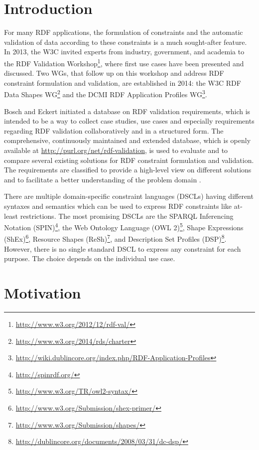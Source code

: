 \documentclass{llncs}
\begin{document}
\section{Introduction}

For many RDF applications, the formulation of constraints and the automatic validation of data according to these constraints is a much sought-after feature. 
In 2013, the W3C invited experts from industry, government, and academia to the RDF Validation Workshop\footnote{\url{http://www.w3.org/2012/12/rdf-val/}}, 
where first use cases have been presented and discussed. 
Two WGs, that follow up on this workshop and address RDF constraint formulation and validation, are established in 2014: 
the W3C RDF Data Shapes WG\footnote{\url{http://www.w3.org/2014/rds/charter}} and the DCMI RDF Application Profiles WG\footnote{\url{http://wiki.dublincore.org/index.php/RDF-Application-Profiles}}. 

Bosch and Eckert \cite{BoschEckert2014} initiated a database on RDF validation requirements, which is intended to be a way to collect case studies, use cases and especially requirements regarding RDF validation collaboratively and in a structured form.
The comprehensive, continuously maintained and extended database, which is openly available at \url{http://purl.org/net/rdf-validation}, is used to evaluate and to compare several existing solutions for RDF constraint formulation and validation. 
The requirements are classified to provide a high-level view on different solutions and to facilitate a better understanding of the problem domain \cite{BoschEckert2014}.  

There are multiple domain-specific constraint languages (DSCLs) having different syntaxes and semantics which can be used to express RDF constraints like at-least restrictions.
The most promising DSCLs are 
the SPARQL Inferencing Notation (SPIN)\footnote{\url{http://spinrdf.org/}}, 
the Web Ontology Language (OWL 2)\footnote{\url{http://www.w3.org/TR/owl2-syntax/}}, 
Shape Expressions (ShEx)\footnote{\url{http://www.w3.org/Submission/shex-primer/}}, 
Resource Shapes (ReSh)\footnote{\url{http://www.w3.org/Submission/shapes/}}, 
and Description Set Profiles (DSP)\footnote{\url{http://dublincore.org/documents/2008/03/31/dc-dsp/}}.
However, there is no single standard DSCL to express any constraint for each purpose.
The choice depends on the individual use case.

\section{Motivation}
\end{document}
